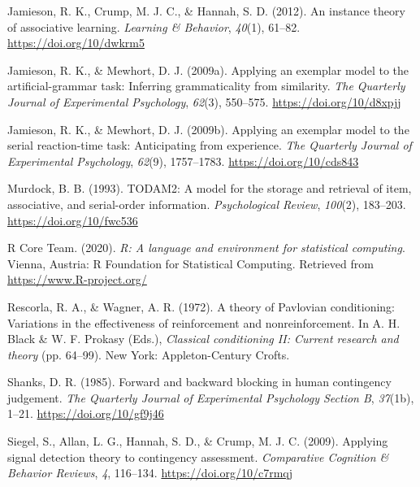 \documentclass[
  english,
  man,floatsintext]{apa6}
\begin{document}
\leavevmode\hypertarget{ref-jamiesonInstanceTheoryAssociative2012}{}%
Jamieson, R. K., Crump, M. J. C., \& Hannah, S. D. (2012). An instance theory of associative learning. \emph{Learning \& Behavior}, \emph{40}(1), 61--82. \url{https://doi.org/10/dwkrm5}

\leavevmode\hypertarget{ref-jamiesonApplyingExemplarModel2009}{}%
Jamieson, R. K., \& Mewhort, D. J. (2009a). Applying an exemplar model to the artificial-grammar task: Inferring grammaticality from similarity. \emph{The Quarterly Journal of Experimental Psychology}, \emph{62}(3), 550--575. \url{https://doi.org/10/d8xpjj}

\leavevmode\hypertarget{ref-jamiesonApplyingExemplarModel2009a}{}%
Jamieson, R. K., \& Mewhort, D. J. (2009b). Applying an exemplar model to the serial reaction-time task: Anticipating from experience. \emph{The Quarterly Journal of Experimental Psychology}, \emph{62}(9), 1757--1783. \url{https://doi.org/10/cds843}

\leavevmode\hypertarget{ref-murdockTODAM2ModelStorage1993}{}%
Murdock, B. B. (1993). TODAM2: A model for the storage and retrieval of item, associative, and serial-order information. \emph{Psychological Review}, \emph{100}(2), 183--203. \url{https://doi.org/10/fwc536}

\leavevmode\hypertarget{ref-R-base}{}%
R Core Team. (2020). \emph{R: A language and environment for statistical computing}. Vienna, Austria: R Foundation for Statistical Computing. Retrieved from \url{https://www.R-project.org/}

\leavevmode\hypertarget{ref-rescorlaTheoryPavlovianConditioning1972}{}%
Rescorla, R. A., \& Wagner, A. R. (1972). A theory of Pavlovian conditioning: Variations in the effectiveness of reinforcement and nonreinforcement. In A. H. Black \& W. F. Prokasy (Eds.), \emph{Classical conditioning II: Current research and theory} (pp. 64--99). New York: Appleton-Century Crofts.

\leavevmode\hypertarget{ref-shanksForwardBackwardBlocking1985}{}%
Shanks, D. R. (1985). Forward and backward blocking in human contingency judgement. \emph{The Quarterly Journal of Experimental Psychology Section B}, \emph{37}(1b), 1--21. \url{https://doi.org/10/gf9j46}

\leavevmode\hypertarget{ref-siegelApplyingSignalDetection2009}{}%
Siegel, S., Allan, L. G., Hannah, S. D., \& Crump, M. J. C. (2009). Applying signal detection theory to contingency assessment. \emph{Comparative Cognition \& Behavior Reviews}, \emph{4}, 116--134. \url{https://doi.org/10/c7rmqj}
\end{document}
